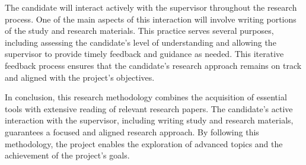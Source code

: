 \documentclass[12pt]{article}
\begin{document}
The candidate will interact actively with the supervisor throughout the research process. 
One of the main aspects of this interaction will involve writing portions of the study and research materials. 
This practice serves several purposes, including assessing the candidate’s level of understanding and allowing the supervisor to provide timely feedback and guidance as needed. 
This iterative feedback process ensures that the candidate’s research approach remains on track and aligned with the project’s objectives.

In conclusion, this research methodology combines the acquisition of essential tools with extensive reading of relevant research papers. 
The candidate’s active interaction with the supervisor, including writing study and research materials, guarantees a focused and aligned research approach. 
By following this methodology, the project enables the exploration of advanced topics and the achievement of the project’s goals.
\end{document}
